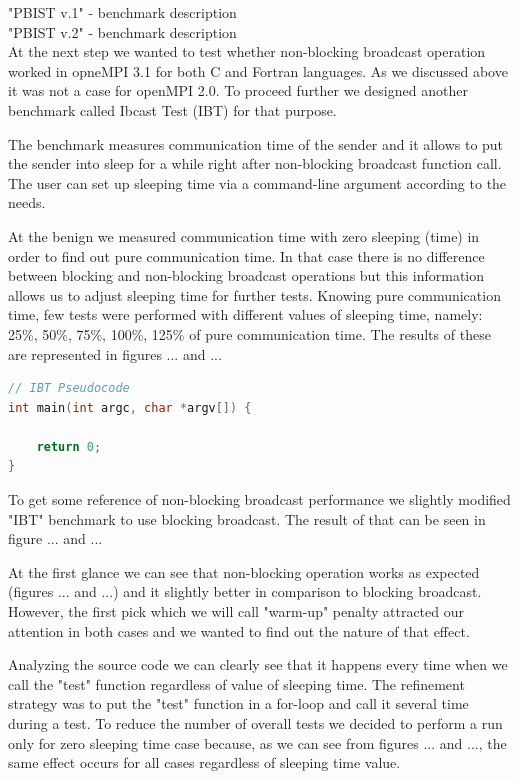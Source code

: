 "PBIST v.1" - benchmark description\\


"PBIST v.2" - benchmark description\\





At the next step we wanted to test whether non-blocking broadcast operation worked in opneMPI 3.1 for both C and Fortran languages. As we discussed above it was not a case for openMPI 2.0. To proceed further we designed another benchmark called Ibcast Test (IBT) for that purpose.\par
The benchmark measures communication time of the sender and it allows to put the sender into sleep for a while right after non-blocking broadcast function call. The user can set up sleeping time via a command-line argument according to the needs.\par

At the benign we measured communication time with zero sleeping (time) in order to find out pure communication time. In that case there is no difference between blocking and non-blocking broadcast operations but this information allows us to adjust sleeping time for further tests. Knowing pure communication time, few tests were performed with different values of sleeping time, namely: 25\%, 50\%, 75\%, 100\%, 125\% of pure communication time. The results of these are represented in figures ... and ...\par

\begin{lstlisting}[language=C]
// IBT Pseudocode
int main(int argc, char *argv[]) {
	
	return 0;    
}
\end{lstlisting}

To get some reference of non-blocking broadcast performance we slightly modified "IBT" benchmark to use blocking broadcast. The result of that can be seen in figure ... and ...\par

At the first glance we can see that non-blocking operation works as expected (figures ... and ...) and it slightly better in comparison to blocking broadcast. However, the first pick which we will call "warm-up" penalty attracted our attention in both cases and we wanted to find out the nature of that effect.\par

Analyzing the source code we can clearly see that it happens every time when we call the "test" function regardless of value of sleeping time. The refinement strategy was to put the "test" function in a for-loop and call it several time during a test. To reduce the number of overall tests we decided to perform a run only for zero sleeping time case because, as we can see from figures ... and ..., the same effect occurs for all cases regardless of sleeping time value. 

